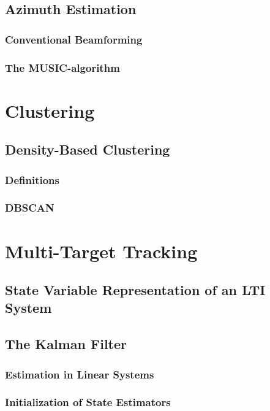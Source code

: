 \documentclass[DIV=15,
fleqn
numbers=noenddot,
headsepline,
captions=tableabove,twoside, openright]{scrreprt}
\begin{document}
\section{Azimuth Estimation}\label{bs:azimuth}

\subsection{Conventional Beamforming}

\subsection{The MUSIC-algorithm}

\chapter{Clustering}\label{ch:cluster}

\section{Density-Based Clustering}\label{cs:Density}

\subsection{Definitions}\label{cs:Def}

\subsection{DBSCAN}\label{cs:dbscan}

\chapter{Multi-Target Tracking}

\section{State Variable Representation of an LTI System}\label{mtt:state}

\section{The Kalman Filter}\label{mtt:kalman}
 
 \subsection{Estimation in Linear Systems}
 
\subsection{Initialization of State Estimators}

\end{document}
